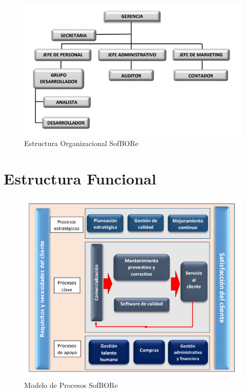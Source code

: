 \begin{figure}[htb]
	\centering
	\includegraphics[width=1.2\linewidth]{capitulo1/img/EstOrgSofBORe.PNG}
	\caption{Estructura Organizacional SofBORe}
\end{figure}

\section{Estructura Funcional}

\begin{figure}[htb]
	\centering
	\includegraphics[width=1.0\linewidth]{capitulo1/img/ProcesosSofBORe.PNG}
	\caption{Modelo de Procesos SofBORe}
\end{figure}
